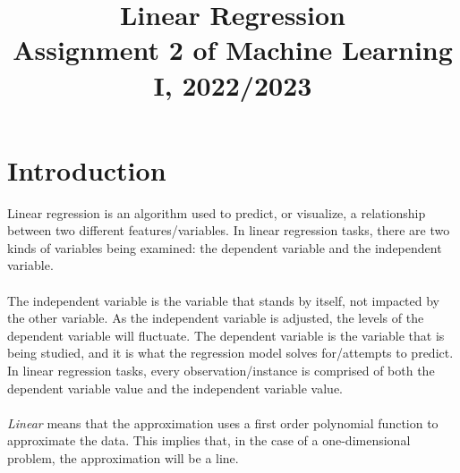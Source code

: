 \documentclass[10pt]{article}
\begin{document}
\noindent



\title{Linear Regression\\Assignment 2 of Machine Learning I, 2022/2023}




\maketitle



\section{Introduction}
Linear regression is an algorithm used to predict, or visualize, a relationship between two different features/variables. In linear regression tasks, there are two kinds of variables being examined: the dependent variable and the independent variable. \\\\The independent variable is the variable that stands by itself, not impacted by the other variable. As the independent variable is adjusted, the levels of the dependent variable will fluctuate. The dependent variable is the variable that is being studied, and it is what the regression model solves for/attempts to predict. In linear regression tasks, every observation/instance is comprised of both the dependent variable value and the independent variable value.\\\\ \textit{Linear} means that the
approximation uses a first order polynomial function to approximate the data. This implies that, in the case of a one-dimensional problem, the approximation will be a line.
\end{document}
